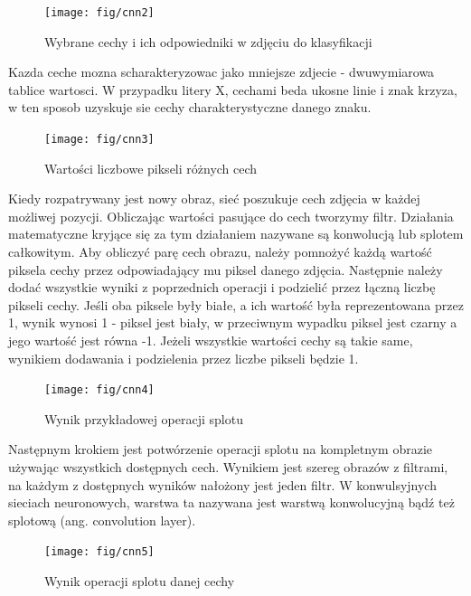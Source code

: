 \documentclass[brudnopis]{xmgr}
\begin{document}
\begin{figure}[!tbh]
\centering
\texttt{[image: fig/cnn2]}
\caption{Wybrane cechy i ich odpowiedniki w zdjęciu do klasyfikacji}
\end{figure}

Kazda ceche mozna scharakteryzowac jako mniejsze zdjecie - dwuwymiarowa tablice wartosci. W przypadku litery X, cechami beda ukosne linie i znak krzyza, w ten sposob uzyskuje sie cechy charakterystyczne danego znaku.

\begin{figure}[!tbh]
\centering
\texttt{[image: fig/cnn3]}
\caption{Wartości liczbowe pikseli różnych cech}
\end{figure}
\newpage

Kiedy rozpatrywany jest nowy obraz, sieć poszukuje cech zdjęcia w każdej możliwej pozycji. Obliczając wartości pasujące do cech  tworzymy filtr. Działania matematyczne kryjące się za tym działaniem nazywane są konwolucją lub splotem całkowitym. Aby obliczyć parę cech obrazu, należy pomnożyć każdą wartość piksela cechy przez odpowiadający mu piksel danego zdjęcia. Następnie należy dodać wszystkie wyniki z poprzednich operacji i podzielić przez łączną liczbę pikseli cechy. Jeśli oba piksele były białe, a ich wartość była reprezentowana przez 1, wynik wynosi 1 - piksel jest biały, w przeciwnym wypadku piksel jest czarny a jego wartość jest równa -1. Jeżeli wszystkie wartości cechy są takie same, wynikiem dodawania i podzielenia przez liczbe pikseli będzie 1.

\begin{figure}[!tbh]
\centering
\texttt{[image: fig/cnn4]}
\caption{Wynik przykładowej operacji splotu}
\end{figure}
\newpage

Następnym krokiem jest potwórzenie operacji splotu na kompletnym obrazie używając wszystkich dostępnych cech. Wynikiem jest szereg obrazów z filtrami, na każdym z dostępnych wyników nałożony jest jeden filtr. W konwulsyjnych sieciach neuronowych, warstwa ta nazywana jest warstwą konwolucyjną bądź też splotową (ang. convolution layer).

\begin{figure}[!tbh]
\centering
\texttt{[image: fig/cnn5]}
\caption{Wynik operacji splotu danej cechy}
\end{figure}
\end{document}
